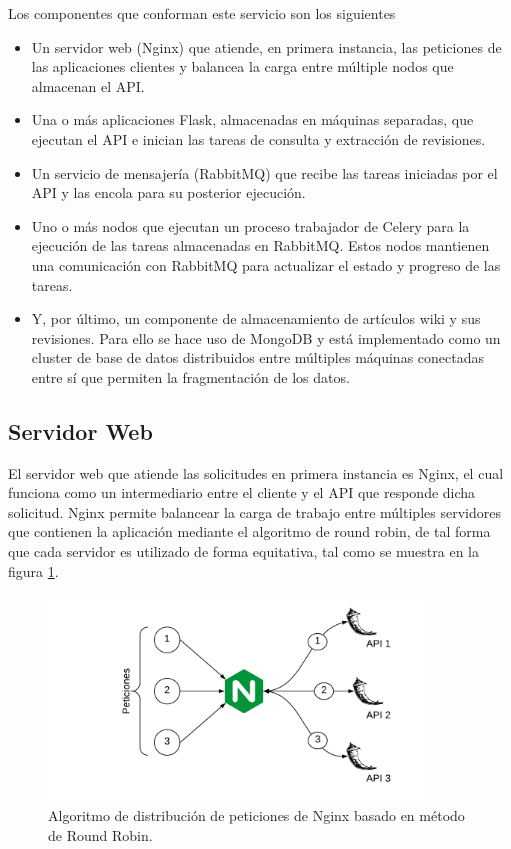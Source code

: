 Los componentes que conforman este servicio son los siguientes

\begin{itemize}

\item Un servidor web (Nginx) que atiende, en primera instancia, las peticiones de las aplicaciones clientes y balancea la carga entre múltiple nodos que almacenan el API.

\item Una o más aplicaciones Flask, almacenadas en máquinas separadas, que ejecutan el API e inician las tareas de consulta y extracción de revisiones.

\item Un servicio de mensajería (RabbitMQ) que recibe las tareas iniciadas por el API
y las encola para su posterior ejecución.

\item Uno o más nodos que ejecutan un proceso trabajador de Celery para la ejecución de las tareas almacenadas en RabbitMQ.
Estos nodos mantienen una comunicación con RabbitMQ para actualizar el estado y progreso de las tareas.

\item Y, por último, un componente de almacenamiento de artículos wiki y sus revisiones. Para ello se hace uso de MongoDB y está implementado como un cluster de base de datos distribuidos
entre múltiples máquinas conectadas entre sí que permiten la fragmentación de los datos.

\end{itemize}

\subsection{Servidor Web}

El servidor web que atiende las solicitudes en primera instancia es Nginx,
el cual funciona como un intermediario entre el cliente y el API que responde dicha solicitud.
Nginx permite balancear la carga de trabajo entre múltiples servidores que contienen la aplicación mediante el algoritmo de round robin,
de tal forma que cada servidor es utilizado de forma equitativa, tal como se muestra en la figura \ref{fig:round_robin}.

\begin{figure}[H]
	\centering
		\includegraphics[width=0.9\textwidth]{figures/round_robin}
	\caption{Algoritmo de distribución de peticiones de Nginx basado en método de Round Robin.}
	\label{fig:round_robin}
\end{figure}

